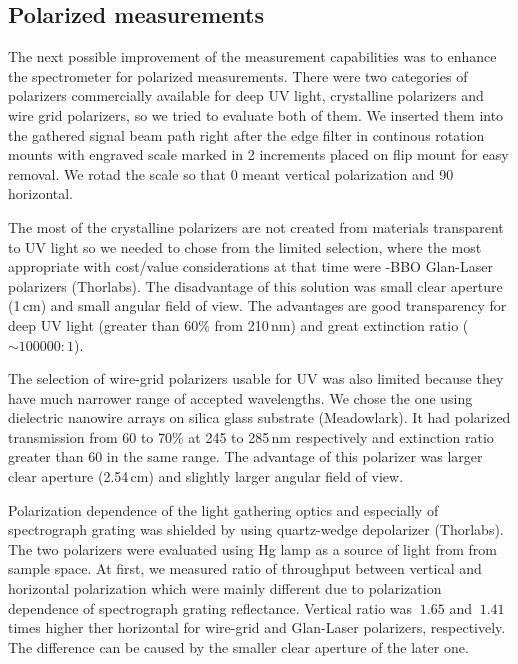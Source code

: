 \subsection{Polarized measurements}

The next possible improvement of the measurement capabilities was to enhance
the spectrometer for polarized measurements. There were two categories of
polarizers commercially available for deep UV light, crystalline polarizers and
wire grid polarizers, so we tried to evaluate both of them. We inserted them
into the gathered signal beam path right after the edge filter in continous
rotation mounts with engraved scale marked in 2\textdegree{} increments placed
on flip mount for easy removal. We rotad the scale so that 0\textdegree{} meant
vertical polarization and 90\textdegree{} horizontal.

The most of the crystalline polarizers are not created from materials
transparent to UV light so we needed to chose from the limited selection,
where the most appropriate with cost/value considerations at that time were
-BBO Glan-Laser polarizers (Thorlabs). The disadvantage of this solution
was small clear aperture (1\,cm) and small angular field of view. The
advantages are good transparency for deep UV light (greater than 60\% from
210\,nm) and great extinction ratio ($\sim 100000:1$).

The selection of wire-grid polarizers usable for UV was also limited because
they have much narrower range of accepted wavelengths. We chose the one using
dielectric nanowire arrays on silica glass substrate (Meadowlark). It had
polarized transmission from 60 to 70\% at 245 to 285\,nm respectively and
extinction ratio greater than 60 in the same range. The advantage of this
polarizer was larger clear aperture (2.54\,cm) and slightly larger angular
field of view.

Polarization dependence of the light gathering optics and especially of
spectrograph grating was shielded by using quartz-wedge depolarizer (Thorlabs).
The two polarizers were evaluated using Hg lamp as a source of light from
from sample space. At first, we measured ratio of throughput between vertical
and horizontal polarization which were mainly different due to polarization
dependence of spectrograph grating reflectance. Vertical ratio was $~1.65$
and $~1.41$ times higher ther horizontal for wire-grid and Glan-Laser
polarizers, respectively. The difference can be caused by the smaller clear
aperture of the later one.

